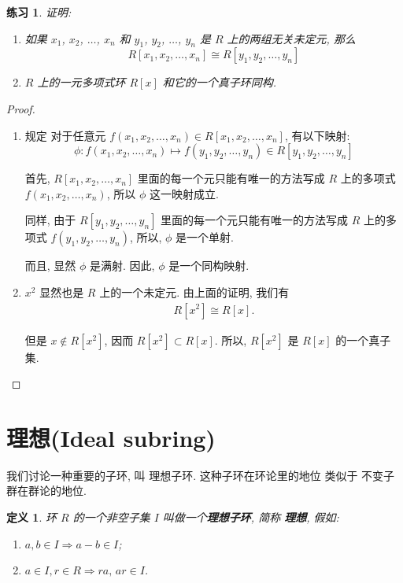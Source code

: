 \documentclass[utf8]{ctexbook}
\newtheorem{definition}{定义}[section]
\newtheorem{exercise}{练习}[section]
\begin{document}
\begin{exercise}
证明:
\begin{enumerate}
\item{如果 $x_1$, $x_2$, $\ldots$, $x_n$ 和 $y_1$, $y_2$, $\ldots$, $y_n$ 是 $R$ 上的两组无关未定元, 那么
\begin{equation}
R[x_1, x_2, \ldots, x_n] \cong R[y_1, y_2, \ldots, y_n]
\end{equation}
}
\item{$R$ 上的一元多项式环 $R[x]$ 和它的一个真子环同构.}
\end{enumerate}
\end{exercise}

\begin{proof}
\begin{enumerate}
\item{规定 对于任意元 $f(x_1, x_2, \ldots , x_n) \in R[x_1, x_2, \ldots, x_n]$, 有以下映射:
\begin{equation}
\phi: f(x_1, x_2, \ldots, x_n) \mapsto f(y_1, y_2, \ldots, y_n) \in R[y_1, y_2, \ldots, y_n] \nonumber
\end{equation}

首先, $R[x_1, x_2, \ldots, x_n]$ 里面的每一个元只能有唯一的方法写成 $R$ 上的多项式 $ f(x_1, x_2, \ldots, x_n)$, 所以 $\phi$ 这一映射成立.

同样, 由于 $R[y_1, y_2, \ldots, y_n]$ 里面的每一个元只能有唯一的方法写成 $R$ 上的多项式 $ f(y_1, y_2, \ldots, y_n)$, 所以, $\phi$ 是一个单射.

而且, 显然 $\phi$ 是满射. 因此, $\phi$ 是一个同构映射.}
\item{$x^2$ 显然也是 $R$ 上的一个未定元. 由上面的证明, 我们有
\begin{align*}
R[x^2] \cong R[x] .
\end{align*}

但是 $x \not \in R[x^2]$, 因而 $R[x^2] \subset R[x]$. 所以, $R[x^2]$ 是 $R[x]$ 的一个真子集.

}
\end{enumerate}
\end{proof}

\section{理想(Ideal subring)}

我们讨论一种重要的子环, 叫 理想子环. 这种子环在环论里的地位 类似于 不变子群在群论的地位.

\begin{definition}\label{def_ideal}
环 $R$ 的一个非空子集 $I$ 叫做一个\textbf{理想子环}, 简称 \textbf{理想}, 假如:
\begin{enumerate}
\item{$a, b \in I \Longrightarrow a - b \in I$;}
\item{$a \in I, r \in R \Longrightarrow ra, \, ar \in I$.\label{def_ideal_condition_2}}
\end{enumerate}
\end{definition}
\end{document}

